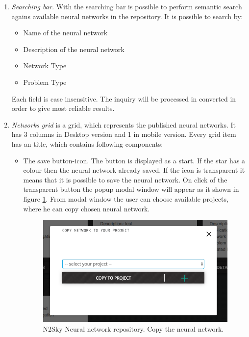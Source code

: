 \begin{enumerate}
\item \emph{Searching bar.} With the searching bar is possible to perform semantic search agains available neural networks in the repository. It is possible to search by: 
\begin{itemize}
\item Name of the neural network
\item Description of the neural network
\item Network Type
\item Problem Type
\end{itemize}

Each field is case insensitive. The inquiry will be processed in converted in order to give most reliable results. 

\item \emph{Networks grid} is a grid, which represents the published neural networks. It has 3 columns in Desktop version and 1 in mobile version. Every grid item has an title, which contains following components:
\begin{itemize}
\item The save button-icon. The button is displayed as a start. If the star has a colour then the neural network already saved. If the icon is transparent it means that it is possible to save the neural network. On click of the transparent button the popup modal window will appear as it shown in figure \ref{fig:copy_nn}. From modal window the user can choose available projects, where he can copy chosen neural network. 


\begin{figure}[htbp]
\begin{center}
  \includegraphics[scale=0.5]{components/5/img/copy_nn.png}
  \caption{N2Sky Neural network repository. Copy the neural network.}
  \label{fig:copy_nn}
\end{center}
\end{figure}


\end{itemize}
\end{enumerate}
